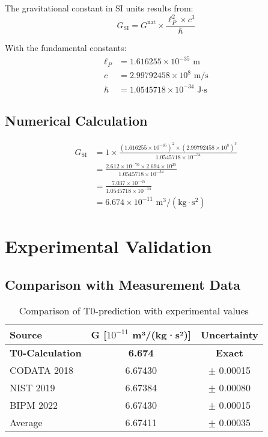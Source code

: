 \documentclass[12pt,a4paper]{article}
\theoremstyle{definition}
\begin{document}
The gravitational constant in SI units results from:
\begin{equation}
	G_{\text{SI}} = G^{\text{nat}} \times \frac{\ell_P^2 \times c^3}{\hbar}
\end{equation}

With the fundamental constants:
\begin{align}
	\ell_P &= 1.616255 \times 10^{-35} \text{ m}\\
	c &= 2.99792458 \times 10^8 \text{ m/s}\\
	\hbar &= 1.0545718 \times 10^{-34} \text{ J·s}
\end{align}

\subsection{Numerical Calculation}

\begin{align}
	G_{\text{SI}} &= 1 \times \frac{(1.616255 \times 10^{-35})^2 \times (2.99792458 \times 10^8)^3}{1.0545718 \times 10^{-34}}\\
	&= \frac{2.612 \times 10^{-70} \times 2.694 \times 10^{25}}{1.0545718 \times 10^{-34}}\\
	&= \frac{7.037 \times 10^{-45}}{1.0545718 \times 10^{-34}}\\
	&= 6.674 \times 10^{-11} \text{ m}^3/(\text{kg} \cdot \text{s}^2)
\end{align}

\section{Experimental Validation}

\subsection{Comparison with Measurement Data}

\begin{table}[h]
	\centering
	\begin{tabular}{@{}lcc@{}}
		\toprule
		\textbf{Source} & \textbf{G [$10^{-11}$ m³/(kg·s²)]} & \textbf{Uncertainty} \\
		\midrule
		\textbf{T0-Calculation} & \textbf{6.674} & \textbf{Exact} \\
		CODATA 2018 & 6.67430 & $\pm$ 0.00015 \\
		NIST 2019 & 6.67384 & $\pm$ 0.00080 \\
		BIPM 2022 & 6.67430 & $\pm$ 0.00015 \\
		Average & 6.67411 & $\pm$ 0.00035 \\
		\bottomrule
	\end{tabular}
	\caption{Comparison of T0-prediction with experimental values}
\end{table}
\end{document}
